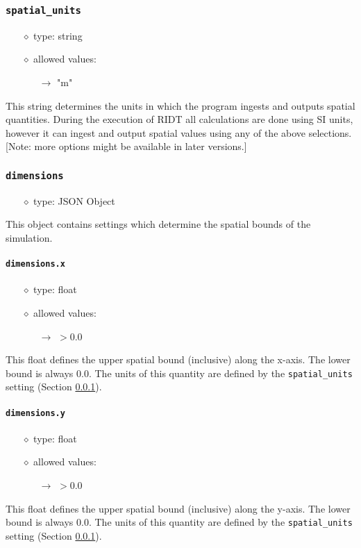\documentclass[]{article}
\def\code#1{\texttt{#1}}
\begin{document}
\subsubsection{\code{spatial\_units}}\label{sec:spatialunits}
\begin{itemize}
    \item[$\diamond$] type: string 
    \item[$\diamond$] allowed values:
    \begin{itemize}
        \item[$\rightarrow$] "m"
    \end{itemize}
\end{itemize}
This string determines the units in which the program ingests and outputs spatial
quantities. During the execution of RIDT all calculations are done using SI
units, however it can ingest and output spatial values using any of the above
selections. [Note: more options might be available in later versions.]

\subsubsection{\code{dimensions}}
\begin{itemize}
    \item[$\diamond$] type: JSON Object 
\end{itemize}
This object contains settings which determine the spatial bounds of the
simulation.

\paragraph{\code{dimensions.x}}\label{sec:dimx}
\begin{itemize}
    \item[$\diamond$] type: float 
    \item[$\diamond$] allowed values:
    \begin{itemize}
        \item[$\rightarrow$] $>0.0$
    \end{itemize}
\end{itemize}
This float defines the upper spatial bound (inclusive) along the x-axis. The
lower bound is always 0.0. The units of this quantity are defined by the
\code{spatial\_units} setting (Section \ref{sec:spatialunits}).

\paragraph{\code{dimensions.y}}\label{sec:dimy}
\begin{itemize}
    \item[$\diamond$] type: float 
    \item[$\diamond$] allowed values:
    \begin{itemize}
        \item[$\rightarrow$] $>0.0$
    \end{itemize}
\end{itemize}
This float defines the upper spatial bound (inclusive) along the y-axis. The
lower bound is always 0.0. The units of this quantity are defined by the
\code{spatial\_units} setting (Section \ref{sec:spatialunits}).
\end{document}
